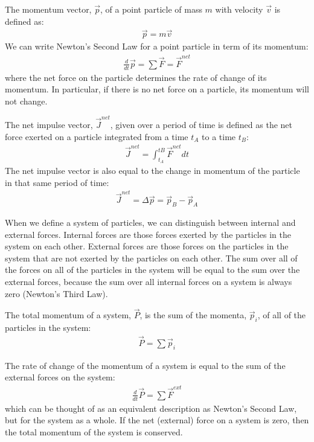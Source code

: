 \begin{chapterSummary}{
The momentum vector, $\vec p$, of a point particle of mass $m$ with velocity $\vec v$ is defined as:
\begin{align*}
\vec p = m\vec v
\end{align*}
We can write Newton's Second Law for a point particle in term of its momentum:
\begin{align*}
\frac{d}{dt}\vec p = \sum \vec F = \vec F^{net}
\end{align*}
where the net force on the particle determines the rate of change of its momentum. In particular, if there is no net force on a particle, its momentum will not change.

The net impulse vector, $\vec J^{net}$, given over a period of time is defined as the net force exerted on a particle integrated from a time $t_A$ to a time $t_B$:
\begin{align*}
\vec J^{net} = \int_{t_A}^{tB} \vec F^{net} dt
\end{align*}
The net impulse vector is also equal to the change in momentum of the particle in that same period of time:
\begin{align*}
\vec J^{net} = \Delta \vec p = \vec p_B - \vec p_A
\end{align*}

When we define a system of particles, we can distinguish between internal and external forces. Internal forces are those forces exerted by the particles in the system on each other. External forces are those forces on the particles in the system that are not exerted by the particles on each other. The sum over all of the forces on all of the particles in the system will be equal to the sum over the external forces, because the sum over all internal forces on a system is always zero (Newton's Third Law).

The total momentum of a system, $\vec P$, is the sum of the momenta, $\vec p_i$, of all of the particles in the system:
\begin{align*}
\vec P = \sum \vec p_i
\end{align*}

The rate of change of the momentum of a system is equal to the sum of the external forces on the system:
\begin{align*}
\frac{d}{dt}\vec P = \sum \vec F^{ext}
\end{align*}
which can be thought of as an equivalent description as Newton's Second Law, but for the system as a whole. If the net (external) force on a system is zero, then the total momentum of the system is conserved. 

}
\end{chapterSummary}
